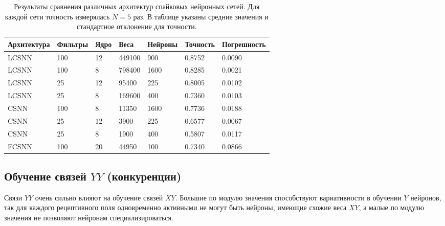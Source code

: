 \documentclass[a4paper]{article}
\begin{document}
\begin{table}[H]
 \caption{Результаты сравнения различных архитектур спайковых нейронных сетей. Для каждой сети точность измерялась $N=5$ раз. В таблице указаны средние значения и стандартное отклонение для точности.}
\begin{center}
\begin{tabular}{|l|l|l|l|l|l|l|}
\hline
Архитектура & Фильтры & Ядро & Веса & Нейроны & Точность & Погрешность\\
\hline
{LCSNN} & {100} & {12} & {449100} & {900} & {0.8752} & {0.0090}\\
\hline
{LCSNN} & {100} & {8} & {798400} & {1600} & {0.8285} & {0.0021}\\
\hline
{LCSNN} & {25} & {12} & {95400} & {225} & {0.8005} & {0.0102}\\
\hline
{LCSNN} & {25} & {8} & {169600} & {400} & {0.7360} & {0.0103}\\
\hline
{CSNN} & {100} & {8} & {11350} & {1600} & {0.7736} & {0.0188}\\
\hline
{CSNN} & {25} & {12} & {3900} & {225} & {0.6577} & {0.0067}\\
\hline
{CSNN} & {25} & {8} & {1900} & {400} & {0.5807} & {0.0117}\\
\hline
{FCSNN} & {100} & {20} & {44950} & {100} & {0.7340} & {0.0866}\\
\hline
\end{tabular}
\end{center}
\end{table}



\subsection{Обучение связей $YY$ (конкуренции)}
Связи $YY$ очень сильно влияют на обучение связей $XY$. Большие по модулю значения способствуют вариативности в обучении $Y$ нейронов, так для каждого рецептивного поля одновременно активными не могут быть нейроны, имеющие схожие веса $XY$, а малые по модулю значения не позволяют нейронам специализироваться.
\end{document}
